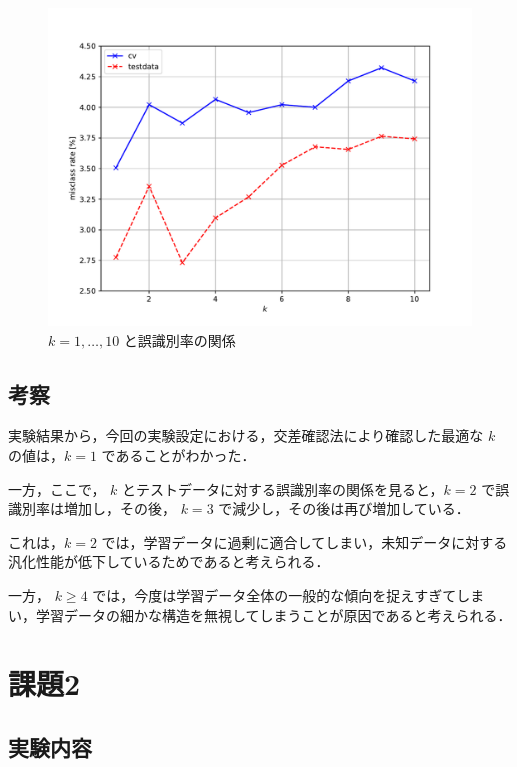 \documentclass[fleqn, a4paper. 12pt]{jsarticle}
\begin{document}
      \begin{figure}[p]
        \centering
        \includegraphics[width=1\textwidth]{fig_2.pdf}
        \caption{$k = 1, \dots, 10$ と誤識別率の関係}
        \label{fig:1}
      \end{figure}

      \quad

    \subsection{考察}

      実験結果から，今回の実験設定における，交差確認法により確認した最適な $k$ の値は，$k = 1$ であることがわかった．

      一方，ここで， $k$ とテストデータに対する誤識別率の関係を見ると，$k = 2$ で誤識別率は増加し，その後， $k=3$ で減少し，その後は再び増加している．

      これは，$k = 2$ では，学習データに過剰に適合してしまい，未知データに対する汎化性能が低下しているためであると考えられる．

      一方， $k \geq 4$ では，今度は学習データ全体の一般的な傾向を捉えすぎてしまい，学習データの細かな構造を無視してしまうことが原因であると考えられる．

  \section{課題2}
    
    \subsection{実験内容}
\end{document}
